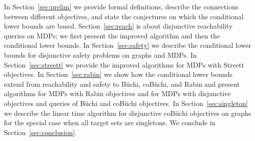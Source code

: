 \documentclass[11pt,letterpaper]{article}
\begin{document}
\smallskip{}
In Section~\ref{sec:prelim} we provide formal definitions, describe the connections
between different objectives, and state the 
conjectures on which the conditional lower bounds are based.
Section~\ref{sec:reach} is about disjunctive reachability queries on MDPs; we 
first present the improved algorithm and then the conditional lower bounds.
In Section~\ref{sec:safety} we describe the conditional lower bounds for disjunctive
safety problems on graphs and MDPs. In Section~\ref{sec:streett} we provide
the improved algorithms for MDPs with Streett objectives. In Section~\ref{sec:rabin}
we show how the conditional lower bounds extend from reachability and safety
to Büchi, coBüchi, and Rabin and present algorithms for MDPs with Rabin objectives and 
for MDPs with disjunctive objectives and queries of Büchi and coBüchi objectives.
In Section~\ref{sec:singleton} we describe the linear time algorithm for disjunctive
coBüchi objectives on graphs for the special case when all target sets are singletons.
We conclude in Section~\ref{sec:conclusion}.
\end{document}
